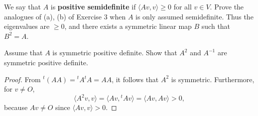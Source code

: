 {{    \item 
    We say that $A$ is \textbf{positive semidefinite} if $\langle Av, v \rangle \geq 0$ for all $v \in V$. 
    Prove the analogues of (a), (b) of Exercise 3 when $A$ is only assumed semidefinite. 
    Thus the eigenvalues are $\geq 0$, and there exists a symmetric linear map $B$ such that $B^2 = A$. 
    \begin{solution}
    \end{solution}
    \item 
    Assume that $A$ is symmetric positive definite. 
    Show that $A^2$ and $A^{-1}$ are symmetric positive definite. 
    \begin{Solution}
        \begin{proof}
            From ${^{t\!}(AA)} = {^{t\!}A}{^{t\!}A} = AA$, it follows that $A^2$ is symmetric. 
            Furthermore, for $v \neq O$, 
            \begin{equation*}
                \langle A^2 v, v \rangle = \langle Av, {^{t\!}A} v \rangle = \langle Av, Av \rangle > 0, 
            \end{equation*}
            because $Av \neq O$ since $\langle Av, v \rangle > 0$. 


\end{proof}
\end{Solution}}}
